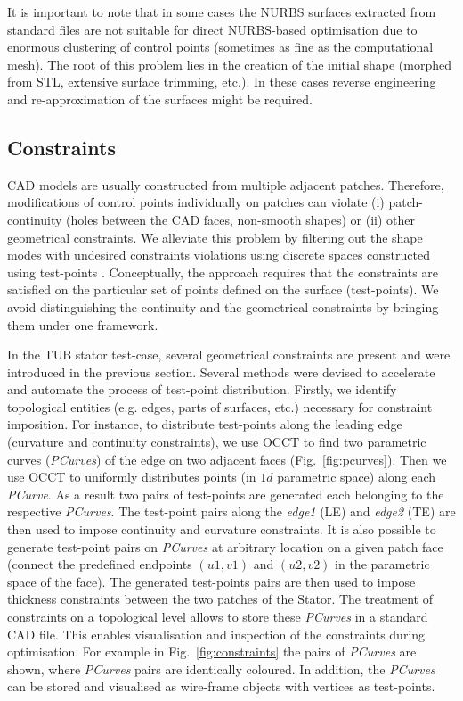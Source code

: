\documentclass[9pt,academicons]{article}
\begin{document}
It is important to note that in some cases the NURBS surfaces extracted from standard files are not suitable for direct NURBS-based optimisation due to enormous clustering of control points (sometimes as fine as the computational mesh). The root of this problem lies in the creation of the initial shape (morphed from STL, extensive surface trimming, etc.). In these cases reverse engineering and re-approximation of the surfaces might be required. 

\bigskip

\subsection{Constraints}

CAD models are usually constructed from multiple adjacent patches. Therefore, modifications of control points individually on patches can violate (i) patch-continuity (holes between the CAD faces, non-smooth shapes) or (ii) other geometrical constraints. We alleviate this problem by filtering out the shape modes with undesired constraints violations using discrete spaces constructed using test-points \cite{xu13:cad-based}. Conceptually, the approach requires that the constraints are satisfied on the particular set of points defined on the surface (test-points). We avoid distinguishing the continuity and the geometrical constraints by bringing them under one framework.


In the TUB stator test-case, several geometrical constraints are present and were introduced in the previous section. Several methods were devised to accelerate and automate the process of test-point distribution. Firstly, we identify topological entities (e.g. edges, parts of surfaces, etc.) necessary for constraint imposition. For instance, to distribute test-points along the leading edge (curvature and continuity constraints), we use OCCT to find two parametric curves (\textit{PCurves}) of the edge on two adjacent faces (Fig.~\ref{fig:pcurves}). Then we use OCCT to uniformly distributes points (in $1d$ parametric space) along each \textit{PCurve}. As a result two pairs of test-points are generated each belonging to the respective \textit{PCurves}. The test-point pairs along the \textit{edge1} (LE) and \textit{edge2} (TE) are then used to impose continuity and curvature constraints. It is also possible to generate test-point pairs on \textit{PCurves} at arbitrary location on a given patch face (connect the predefined endpoints $(u1,v1)$ and $(u2,v2)$ in the parametric space of the face). The generated test-points pairs are then used to impose thickness constraints between the two patches of the Stator. The treatment of constraints on a topological level allows to store these \textit{PCurves} in a standard CAD file. This enables visualisation and inspection of the constraints during optimisation. For example in Fig.~\ref{fig:constraints} the pairs of \textit{PCurves} are shown, where \textit{PCurves} pairs are identically coloured. In addition, the \textit{PCurves} can be stored and visualised as wire-frame objects with vertices as test-points.
\end{document}
